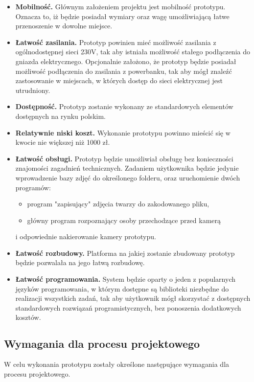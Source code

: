 \documentclass[a4paper,12pt,reqno]{article}
\begin{document}
\begin{itemize}
	\item \textbf{Mobilność.} Głównym założeniem projektu jest mobilność prototypu. Oznacza to, iż będzie posiadał wymiary oraz wagę umożliwiającą łatwe przenoszenie w dowolne miejsce.
	\item \textbf{Łatwość zasilania.} Prototyp powinien mieć możliwość zasilania z ogólnodostępnej sieci 230V, tak aby istniała możliwość stałego podłączenia do gniazda elektrycznego. Opcjonalnie założono, że prototyp będzie posiadał możliwość podłączenia do zasilania z powerbanku, tak aby mógł znaleźć zastosowanie w miejscach, w których dostęp do sieci elektrycznej jest utrudniony.
	\item \textbf{Dostępność.} Prototyp zostanie wykonany ze standardowych elementów dostępnych na rynku polskim.
	\item \textbf{Relatywnie niski koszt.} Wykonanie prototypu powinno mieścić się w kwocie nie większej niż 1000 zł.
	\item \textbf{Łatwość obsługi.} Prototyp będzie umożliwiał obsługę bez konieczności znajomości zagadnień technicznych. Zadaniem użytkownika będzie jedynie wprowadzenie bazy zdjęć do określonego folderu, oraz uruchomienie dwóch programów:
		\begin{itemize}
			\item program "zapisujący" zdjęcia twarzy do zakodowanego pliku,
			\item główny program rozpoznający osoby przechodzące przed kamerą
		\end{itemize}
	i odpowiednie nakierowanie kamery prototypu.
	\item \textbf{Łatwość rozbudowy.} Platforma na jakiej zostanie zbudowany prototyp będzie pozwalała na jego łatwą rozbudowę.
	\item \textbf{Łatwość programowania.} System będzie oparty o jeden z popularnych języków programowania, w którym dostępne są biblioteki niezbędne do realizacji wszystkich zadań, tak aby użytkownik mógł skorzystać z dostępnych standardowych rozwiązań programistycznych, bez ponoszenia dodatkowych kosztów.
\end{itemize}

\subsection{Wymagania dla procesu projektowego}

W celu wykonania prototypu zostały określone następujące wymagania dla procesu projektowego.
\end{document}
